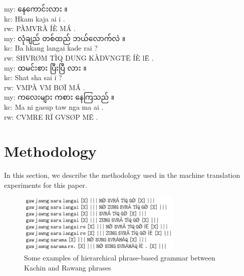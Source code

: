 \documentclass[conference]{IEEEtran}
\begin{document}
\noindent my: {\padauktext နေကောင်းလား ။}\\
kc:  Hkam kaja ai i .\\
rw: PÀMVRÀ ÍÈ MÁ .\\

\noindent my: {\padauktext  လုံချည် တစ်ထည် ဘယ်လောက်လဲ ။}\\
kc:  Ba hkang langai  kade rai ?\\
rw: SHVRØM TÌQ DUNG KÀDVNGTĒ ÍÈ lĒ .\\

\noindent my: {\padauktext  ထမင်းစား ပြီးပြီ လား ။}\\
kc:  Shat   sha  sai i ?\\
rw: VMPÀ VM BØĪ MÁ .\\

\noindent my: {\padauktext ကလေးများ ကစား နေကြသည် ။}\\
kc:  Ma ni  gasup taw nga ma ai .\\
rw: CVMRE RĪ GVSØP MĒ .\\

\section{Methodology}
\label{sec:Method}
In this section, we describe the methodology used in the machine translation experiments for this paper.

\begin{figure}[ht!]
  \centering
\includegraphics[width=0.7\textwidth]{./fig/kc-rw-hpbsmt-phrase-table.png}
  \caption{Some examples of hierarchical phrase-based grammar between Kachin and Rawang phrases}
\label{fig:hpbsmtFig}
\end{figure}
\end{document}
